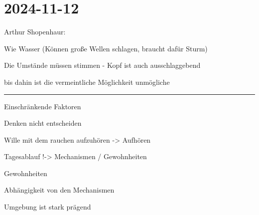 \section{2024-11-12 }


Arthur Shopenhaur:

\startitemize[packed]
\item Wie Wasser (Können große Wellen schlagen, braucht dafür Sturm)
\item Die Umstände müssen stimmen - Kopf ist auch ausschlaggebend 
\item bis dahin ist die vermeintliche Möglichkeit unmögliche
\stopitemize

\blank
\hrule
\blank

Einschränkende Faktoren
\startitemize[packed]
\item Denken nicht entscheiden
\item Wille mit dem rauchen aufzuhören -> Aufhören
\item Tagesablauf !-> Mechanismen / Gewohnheiten 
\item Gewohnheiten 
\item Abhängigkeit von den Mechanismen
\item Umgebung ist stark prägend
\stopitemize



